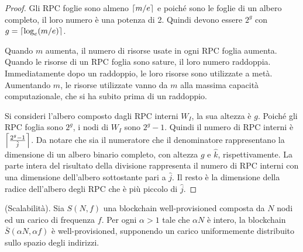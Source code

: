 \begin{proof}
Gli RPC foglie sono almeno $\ceil*{m/e}$ e poiché sono le foglie di un albero completo, il loro numero è una potenza di 2. Quindi devono essere $2^g$ con $g = \ceil*{\log_e (m/e)}$.

Quando $m$ aumenta, il numero di risorse usate in ogni RPC foglia aumenta. Quando le risorse di un RPC foglia sono sature, il loro numero raddoppia. Immediatamente dopo un raddoppio, le loro risorse sono utilizzate a metà. Aumentando $m$, le risorse utilizzate vanno da $m$ alla massima capacità computazionale, che si ha subito prima di un raddoppio.

Si consideri l'albero composto dagli RPC interni $W_I$, la sua altezza è $g$. Poiché gli RPC foglia sono $2^g$, i nodi di $W_I$ sono $2^g -1$. Quindi il numero di RPC interni è $\ceil*{\frac{2^g-1}{\hat{j}}}$.
Da notare che sia il numeratore che il denominatore rappresentano la dimensione di un albero binario completo, con altezza $g$ e $\hat{k}$, rispettivamente. La parte intera del risultato della divisione rappresenta il numero di RPC interni con una dimensione dell'albero sottostante pari a $\hat{j}$. Il resto è la dimensione della radice dell'albero degli RPC che è più piccolo di $\hat{j}$.
\end{proof}


\begin{theorem}{(Scalabilità).}\label{th:scalability}
Sia $S(N, f)$ una blockchain well-provisioned composta da $N$ nodi ed un carico di frequenza $f$. Per ogni $\alpha > 1$ tale che $\alpha N$ è intero, la blockchain $\bar{S}(\alpha N, \alpha f)$ è well-provisioned, supponendo un carico uniformemente distribuito sullo spazio degli indirizzi.
\end{theorem}

